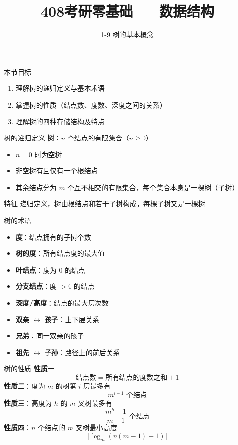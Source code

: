 \documentclass[10pt, aspectratio=169]{beamer}
\title{408考研零基础 --- 数据结构}
\subtitle{1-9 树的基本概念}
\author{}
\date{}
\begin{document}
\begin{frame}{本节目标}
    \begin{enumerate}
        \item 理解树的递归定义与基本术语
        \item 掌握树的性质（结点数、度数、深度之间的关系）
        \item 理解树的四种存储结构及特点
    \end{enumerate}
\end{frame}

\begin{frame}{树的递归定义}
    \textbf{树}：$n$ 个结点的有限集合（$n \ge 0$）
    \vspace{0.3em}
    \begin{itemize}
        \item $n = 0$ 时为空树
        \item 非空树有且仅有一个根结点
        \item 其余结点分为 $m$ 个互不相交的有限集合，每个集合本身是一棵树（子树）
    \end{itemize}
    \vspace{0.5em}
    \begin{block}{特征}
        递归定义，树由根结点和若干子树构成，每棵子树又是一棵树
    \end{block}
\end{frame}

\begin{frame}{树的术语}
    \begin{itemize}
        \item \textbf{度}：结点拥有的子树个数
        \item \textbf{树的度}：所有结点度的最大值
        \item \textbf{叶结点}：度为 0 的结点
        \item \textbf{分支结点}：度 $> 0$ 的结点
        \item \textbf{深度/高度}：结点的最大层次数
        \item \textbf{双亲} $\leftrightarrow$ \textbf{孩子}：上下层关系
        \item \textbf{兄弟}：同一双亲的孩子
        \item \textbf{祖先} $\leftrightarrow$ \textbf{子孙}：路径上的前后关系
    \end{itemize}
\end{frame}

\begin{frame}{树的性质}
    \textbf{性质一}
    \[
    \text{结点数} = \text{所有结点的度数之和} + 1
    \]
    \vspace{0.3em}
    \textbf{性质二}：度为 $m$ 的树第 $i$ 层最多有
    \[
    m^{i-1} \text{ 个结点}
    \]
    \vspace{0.3em}
    \textbf{性质三}：高度为 $h$ 的 $m$ 叉树最多有
    \[
    \frac{m^h - 1}{m - 1} \text{ 个结点}
    \]
    \vspace{0.3em}
    \textbf{性质四}：$n$ 个结点的 $m$ 叉树最小高度
    \[
    \lceil \log_m(n(m-1) + 1) \rceil
    \]
\end{frame}
\end{document}
